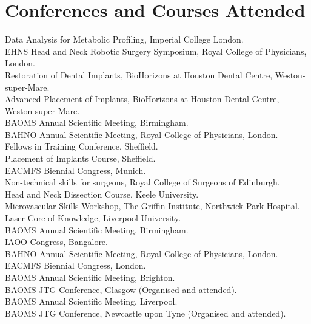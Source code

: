 \section*{Conferences and Courses Attended}

 Data Analysis for Metabolic Profiling, Imperial College London. \\
 EHNS Head and Neck Robotic Surgery Symposium, Royal College of Physicians, London. \\
 Restoration of Dental Implants, BioHorizons at Houston Dental Centre,  Weston-super-Mare. \\
 Advanced Placement of Implants, BioHorizons at Houston Dental Centre,  Weston-super-Mare. \\
 BAOMS Annual Scientific Meeting, Birmingham. \\
 BAHNO Annual Scientific Meeting, Royal College of Physicians, London. \\
 Fellows in Training Conference,  Sheffield. \\
 Placement of Implants Course, Sheffield. \\
 EACMFS Biennial Congress, Munich. \\
 Non-technical skills for surgeons, Royal College of Surgeons of Edinburgh. \\
 Head and Neck Dissection Course, Keele University. \\
 Microvascular Skills Workshop, The Griffin Institute, Northwick Park Hospital. \\
 Laser Core of Knowledge, Liverpool University. \\
 BAOMS Annual Scientific Meeting, Birmingham. \\
 IAOO Congress, Bangalore. \\
 BAHNO Annual Scientific Meeting, Royal College of Physicians, London. \\
 EACMFS Biennial Congress, London. \\
 BAOMS Annual Scientific Meeting, Brighton. \\
 BAOMS JTG Conference, Glasgow (Organised and attended). \\
 BAOMS Annual Scientific Meeting, Liverpool. \\
 BAOMS JTG Conference, Newcastle upon Tyne (Organised and attended). \\
